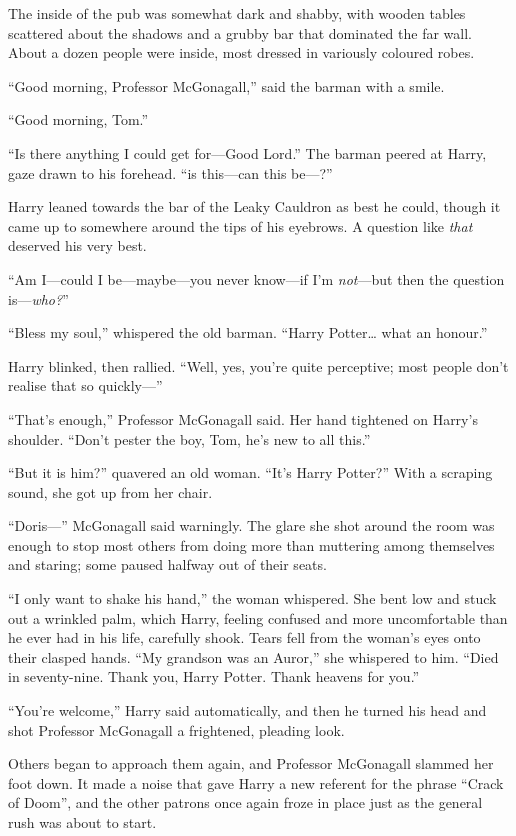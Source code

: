 The inside of the pub was somewhat dark and shabby, with
wooden tables scattered about the shadows and a grubby
bar that dominated the far wall. About a dozen people
were inside, most dressed in variously coloured robes.

“Good morning, Professor McGonagall,” said the barman
with a smile.

“Good morning, Tom.”

“Is there anything I could get for—Good Lord.” The barman
peered at Harry, gaze drawn to his forehead. “is this—can this be—?”

Harry leaned towards the bar of the Leaky Cauldron as best he could, though it
came up to somewhere around the tips of his eyebrows. A question like
\emph{that} deserved his very best.

“Am I—could I be—maybe—you never know—if I’m \emph{not}—but then the
question is—\emph{who?}”

“Bless my soul,” whispered the old barman. “Harry Potter… what an
honour.”

Harry blinked, then rallied. “Well, yes, you’re quite perceptive; most people
don’t realise that so quickly—”

“That’s enough,” Professor McGonagall said. Her hand tightened on Harry’s
shoulder. “Don’t pester the boy, Tom, he’s new to all this.”

“But it is him?” quavered an old woman. “It’s Harry Potter?” With a scraping
sound, she got up from her chair.

“Doris—” McGonagall said warningly. The glare she shot around the room
was enough to stop most others from doing
more than muttering among themselves and staring;
some paused halfway out of their seats.

“I only want to shake his hand,” the woman whispered. She bent low and stuck
out a wrinkled palm, which Harry, feeling confused and more uncomfortable than
he ever had in his life, carefully shook. Tears fell from the woman’s eyes onto
their clasped hands. “My grandson was an Auror,” she whispered to him. “Died in
seventy-nine. Thank you, Harry Potter. Thank heavens for you.”

“You’re welcome,” Harry said automatically, and then he turned his head and
shot Professor McGonagall a frightened, pleading look.

Others began to approach them again, and Professor
McGonagall slammed her foot down. It made a noise that
gave Harry a new referent for the phrase “Crack of
Doom”, and the other patrons once again froze in
place just as the general rush was about to start.

